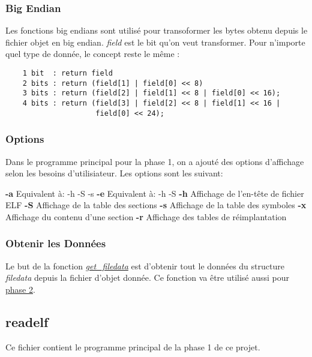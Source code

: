 \documentclass[a4paper]{article} %
\begin{document}
\subsubsection*{Big Endian}
\label{sec:endian}
Les fonctions big endians sont utilisé pour transoformer les bytes obtenu depuis 
le fichier objet en big endian. \textit{field} est le bit qu'on veut transformer. 
Pour n'importe quel type de donnée, le concept reste le même :
\begin{lstlisting}
    1 bit  : return field 
    2 bits : return (field[1] | field[0] << 8)
    3 bits : return (field[2] | field[1] << 8 | field[0] << 16);
    4 bits : return (field[3] | field[2] << 8 | field[1] << 16 | 
                     field[0] << 24);
\end{lstlisting}

\subsubsection*{Options}
\label{sec:options}
Dans le programme principal pour la phase 1, on a ajouté des options d'affichage 
selon les besoins d'utilisiateur. Les options sont les suivant:

\tabto{3em} \textbf{-a} \tabto{10em} Equivalent à: -h -S -s
\tabto{3em} \textbf{-e} \tabto{10em} Equivalent à: -h -S
\tabto{3em} \textbf{-h} \tabto{10em} Affichage de l'en-tête de fichier ELF
\tabto{3em} \textbf{-S} \tabto{10em} Affichage de la table des sections
\tabto{3em} \textbf{-s} \tabto{10em} Affichage de la table des symboles
\tabto{3em} \textbf{-x} \tabto{10em} Affichage du contenu d'une section
\tabto{3em} \textbf{-r} \tabto{10em} Affichage des tables de réimplantation

\subsubsection*{Obtenir les Données}
\label{sec:data}
Le but de la fonction \hyperref[sec:filedata]{\textit{get\_filedata}} est d'obtenir tout le données du 
structure \textit{filedata} depuis la fichier d'objet donnée. Ce fonction va être 
utilisé aussi pour \hyperref[sec:phase2]{phase 2}. 


\subsection{readelf}
\label{sec:readelf}
Ce fichier contient le programme principal de la phase 1 de ce projet. 
\end{document}
